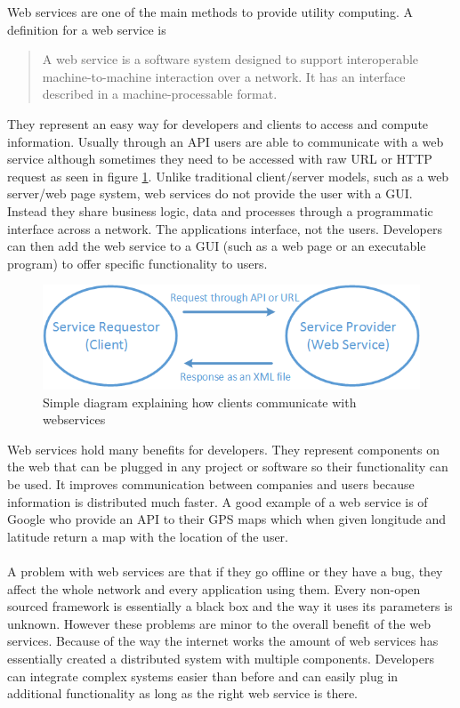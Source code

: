  Web services are one of the main methods to provide utility computing. A definition for a web service is  
\begin{quote}A web service is a software system designed to support interoperable machine-to-machine interaction over a network. 
It has an interface described in a machine-processable format.\cite{webservdef}\end{quote}
They represent an easy way for developers and clients to access and compute information. Usually through an API users are
able to communicate with a web service although sometimes they need to be accessed with raw URL or HTTP request as seen in figure \ref{fig:webserv}.
Unlike traditional client/server models, such as a web server/web page system, web services do not provide the user with a GUI.
Instead they share business logic, data and processes through a programmatic interface across a network. The applications
interface, not the users. Developers can then add the web service to a GUI (such as a web page or an executable program) to offer
specific functionality to users.
\begin{figure}[htp]
\centering
\includegraphics[scale=0.7]{Figures/WebService.png}
\caption{Simple diagram explaining how clients communicate with webservices}
\label{fig:webserv}
\end{figure}
Web services hold many benefits for developers. They represent components on the web that can be plugged in any project
or software so their functionality can be used. It improves communication between companies and users because information
is distributed much faster. A good example of a web service is of Google who provide an API to their GPS maps which when 
given longitude and latitude return a map with the location of the user.
\paragraph{}
A problem with web services are that if they go offline or they have a bug, they affect the whole network and every
application using them. Every non-open sourced framework is essentially a black box and the way it uses its parameters is unknown.
However these problems are minor to the overall benefit of the web services. Because of the way the internet works
the amount of web services has essentially created a distributed system with multiple components. Developers can integrate
complex systems easier than before and can easily plug in additional functionality as long as the right web service is there.



